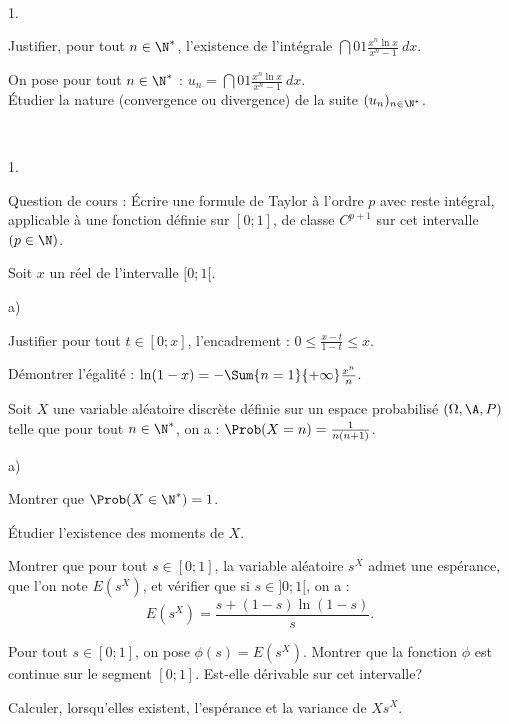 \documentclass[11pt]{article}%
\begin{document}
\begin{exerciceSP}~
  \begin{noliste}{1.}
    \setlength{\itemsep}{2mm}
  \item Justifier, pour tout $n \in \N^*$, l'existence de l'intégrale
    $\dint{0}{1} \frac{ x^n \ln x }{ x^n - 1 } \ dx$.
  \item On pose pour tout $n \in \N^*$ : $u_n = \dint{0}{1} \frac{ x^n
      \ln x }{ x^n - 1 } \ dx$.\\
    Étudier la nature (convergence ou divergence) de la suite $(u_n)_{
      n \in \N^* }$.
  \end{noliste}
\end{exerciceSP}


\newpage


\begin{exerciceAP}~
  \begin{noliste}{1.}
    \setlength{\itemsep}{2mm}
  \item Question de cours : Écrire une formule de Taylor à l'ordre $p$
    avec reste intégral, applicable à une fonction définie sur
    $[0;1]$, de classe $C^{p+1}$ sur cet intervalle $(p \in \N)$.

  \item Soit $x$ un réel de l'intervalle $[0;1[$. 
    \begin{noliste}{a)}
    \setlength{\itemsep}{2mm}
    \item Justifier pour tout $t \in [0;x]$, l'encadrement : $0 \leq
      \frac{ x - t }{ 1 - t } \leq x $.
    \item Démontrer l'égalité : $\ln (1-x) = - \Sum{n=1}{+\infty}
      \frac{ x^n }{ n }$.
    \end{noliste}

  \item Soit $X$ une variable aléatoire discrète définie sur un espace
    probabilisé $(\Omega , \A , P)$ telle que pour tout $n \in \N^*$,
    on a : $\Prob(X=n) = \frac{ 1 }{ n ( n+1) }$.
    \begin{noliste}{a)}
    \setlength{\itemsep}{2mm}
    \item Montrer que $\Prob(X \in \N^*) = 1$.
    \item Étudier l'existence des moments de $X$.
    \item Montrer que pour tout $s \in [0;1]$, la variable aléatoire
      $s^X$ admet une espérance, que l'on note $E (s^X)$, et vérifier
      que si $s \in ]0;1[$, on a :
      \[
      E ( s^X ) = \frac{ s + (1-s) \ln (1-s) }{ s } . 
      \]

    \item Pour tout $s \in [0;1]$, on pose $\phi(s) = E
      (s^X)$. Montrer que la fonction $\phi$ est continue sur le
      segment $[0;1]$. Est-elle dérivable sur cet intervalle?

    \item Calculer, lorsqu'elles existent, l'espérance et la variance
      de $X s^X$.
    \end{noliste}
  \end{noliste}
\end{exerciceAP}
\end{document}
